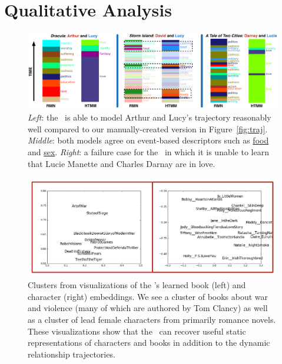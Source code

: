 \section{Qualitative Analysis}
\label{sec:discussion}

\begin{figure}[ht]
\includegraphics[width=1.0\linewidth]{2016_naacl_relationships/figures/good_bad_traj.pdf}
  \caption{\emph{Left}: the \rmn\ is able to model Arthur and Lucy's trajectory
    reasonably well compared to our manually-created version in
    Figure~\ref{fig:traj}. \emph{Middle}: both models agree on event-based
    descriptors such as \underline{food} and \underline{sex}. \emph{Right}: a
    failure case for the \rmn\ in which it is unable to learn that Lucie Manette
    and Charles Darnay are in love.}
\label{fig:goodbadtraj}
\end{figure}

\begin{figure}[ht]
\includegraphics[width=1.0\linewidth]{2016_naacl_relationships/figures/charbookembeddings.pdf}
  \caption{Clusters from  visualizations of the \rmn's learned book (left) and character (right) embeddings. We see a cluster of books about war and violence (many of which are authored by Tom Clancy) as well as a cluster of lead female characters from primarily romance novels. These visualizations show that the \rmn\ can recover useful static representations of characters and books in addition to the dynamic relationship trajectories.}
\label{fig:bookpca}
\end{figure}

